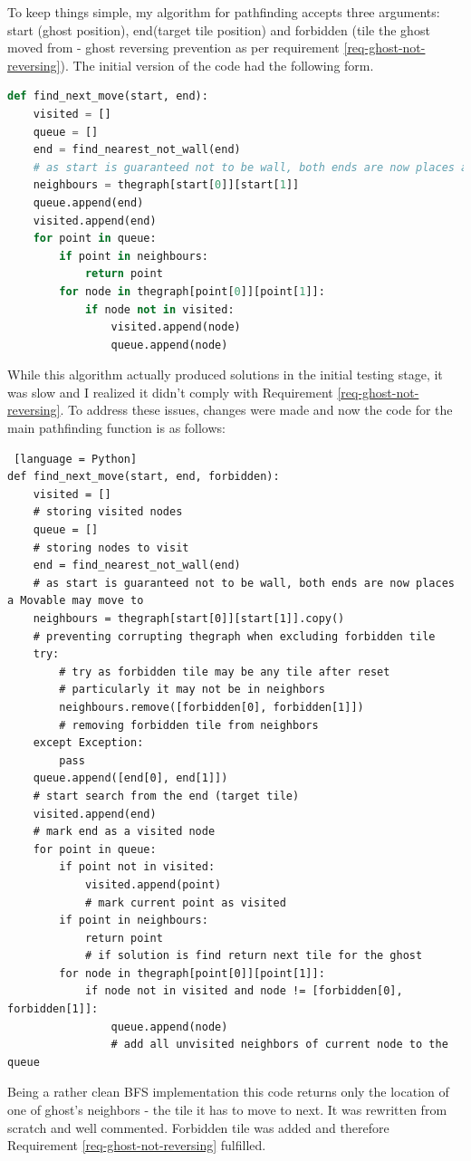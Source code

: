 \documentclass[11pt,a4paper,notitlepage]{report}
\begin{document}
				To keep things simple, my algorithm for pathfinding accepts three arguments: start (ghost position), end(target tile position) and forbidden (tile the ghost moved from - ghost reversing prevention as per requirement \ref{req-ghost-not-reversing}).
				The initial version of the code had the following form.
				\begin{lstlisting}[language=Python]
def find_next_move(start, end):
	visited = []
	queue = []
	end = find_nearest_not_wall(end)
	# as start is guaranteed not to be wall, both ends are now places a Movable may move to
	neighbours = thegraph[start[0]][start[1]]
	queue.append(end)
	visited.append(end)
	for point in queue:
		if point in neighbours:
			return point
		for node in thegraph[point[0]][point[1]]:
			if node not in visited:
				visited.append(node)
				queue.append(node)
				\end{lstlisting}
				While this algorithm actually produced solutions in the initial testing stage, it was slow and I realized it didn't comply with Requirement \ref{req-ghost-not-reversing}. To address these issues, changes were made and now the code for the main pathfinding function is as follows:
				\begin{lstlisting} [language = Python]
def find_next_move(start, end, forbidden):
	visited = []
	# storing visited nodes
	queue = []
	# storing nodes to visit
	end = find_nearest_not_wall(end)
	# as start is guaranteed not to be wall, both ends are now places a Movable may move to
	neighbours = thegraph[start[0]][start[1]].copy()
	# preventing corrupting thegraph when excluding forbidden tile
	try:
		# try as forbidden tile may be any tile after reset
		# particularly it may not be in neighbors
		neighbours.remove([forbidden[0], forbidden[1]])
		# removing forbidden tile from neighbors
	except Exception:
		pass
	queue.append([end[0], end[1]])
	# start search from the end (target tile)
	visited.append(end)
	# mark end as a visited node
	for point in queue:
		if point not in visited:
			visited.append(point)
			# mark current point as visited
		if point in neighbours:
			return point
			# if solution is find return next tile for the ghost
		for node in thegraph[point[0]][point[1]]:
			if node not in visited and node != [forbidden[0], forbidden[1]]:
				queue.append(node)
				# add all unvisited neighbors of current node to the queue
				\end{lstlisting}
Being a rather clean BFS implementation this code returns only the location of one of ghost's neighbors - the tile it has to move to next. It was rewritten from scratch and well commented. Forbidden tile was added and therefore Requirement \ref{req-ghost-not-reversing} fulfilled.
\end{document}

